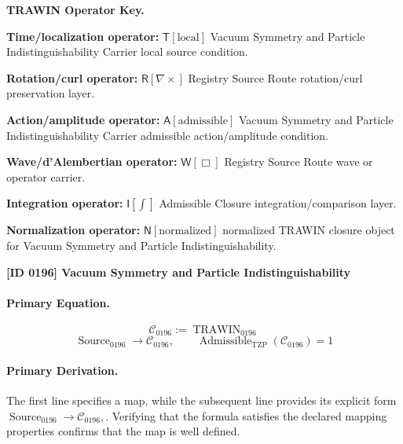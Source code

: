 \par\vspace{0.45\baselineskip}
\noindent\begin{minipage}[t]{\linewidth}
\begingroup
\small
\raggedright
\textbf{TRAWIN Operator Key.}\par
\noindent\textbf{Time/localization operator:} $\mathsf{T}\!\left[\mathrm{local}\right]$ Vacuum Symmetry and Particle Indistinguishability Carrier local source condition.\par
\noindent\textbf{Rotation/curl operator:} $\mathsf{R}\!\left[\nabla\times\right]$ Registry Source Route rotation/curl preservation layer.\par
\noindent\textbf{Action/amplitude operator:} $\mathsf{A}\!\left[\mathrm{admissible}\right]$ Vacuum Symmetry and Particle Indistinguishability Carrier admissible action/amplitude condition.\par
\noindent\textbf{Wave/d'Alembertian operator:} $\mathsf{W}\!\left[\Box\right]$ Registry Source Route wave or operator carrier.\par
\noindent\textbf{Integration operator:} $\mathsf{I}\!\left[\int\right]$ Admissible Closure integration/comparison layer.\par
\noindent\textbf{Normalization operator:} $\mathsf{N}\!\left[\mathrm{normalized}\right]$ normalized TRAWIN closure object for Vacuum Symmetry and Particle Indistinguishability.\par
\endgroup
\end{minipage}

\clearpage
\noindent\textbf{[ID 0196] Vacuum Symmetry and Particle Indistinguishability}\par
\vspace{0.35em}
\paragraph{Primary Equation.}
\[
\mathcal{C}_{0196} := \operatorname{TRAWIN}_{0196}
\]
\[
\operatorname{Source}_{0196}\longrightarrow \mathcal{C}_{0196},
\qquad
\operatorname{Admissible}_{\mathrm{TZP}}\!\left(\mathcal{C}_{0196}\right)=1
\]

\paragraph{Primary Derivation.}
The first line specifies a map, while the subsequent line provides its explicit form \( \operatorname{Source}_{0196}\longrightarrow \mathcal{C}_{0196}, \). Verifying that the formula satisfies the declared mapping properties confirms that the map is well defined.

